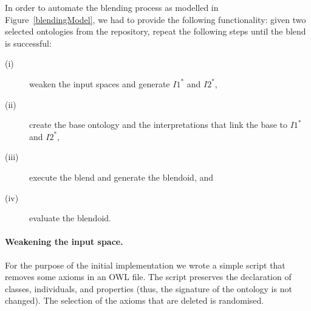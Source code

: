 \documentclass{ecai2012}
\begin{document}
In order to automate the blending process as modelled in Figure~\ref{blendingModel}, 
we had to  provide the following functionality: given two selected ontologies from the 
repository, repeat the following steps until the blend is successful: 

\begin{description}
	\item[(i)] weaken the input spaces and generate $I1^*$ and $I2^*$, 
	\item[(ii)] create the base ontology and the  interpretations that link the base to $I1^*$ and $I2^*$,  
	\item[(iii)] execute the blend  and generate the blendoid, and
	\item[(iv)] evaluate the blendoid.  
\end{description}



\paragraph{Weakening the input space.} For the purpose of the initial implementation
 we wrote a simple script that removes some axioms in an OWL file.
  The script preserves the declaration of classes, individuals, and properties
   (thus, the signature of the ontology is not changed). 
   The selection of the axioms that are deleted is randomised.
\end{document}
